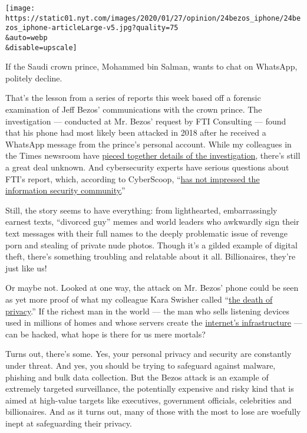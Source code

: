 \texttt{[image: https://static01.nyt.com/images/2020/01/27/opinion/24bezos\_iphone/24bezos\_iphone-articleLarge-v5.jpg?quality=75\\\&auto=webp\\\&disable=upscale]}

If the Saudi crown prince, Mohammed bin Salman, wants to chat on
WhatsApp, politely decline.

That's the lesson from a series of reports this week based off a
forensic examination of Jeff Bezos' communications with the crown
prince. The investigation --- conducted at Mr. Bezos' request by FTI
Consulting --- found that his phone had most likely been attacked in
2018 after he received a WhatsApp message from the prince's personal
account. While my colleagues in the Times newsroom have
\href{https://www.nytimes.com/2020/01/22/technology/jeff-bezos-hack-iphone.html}{pieced
together details of the investigation}, there's still a great deal
unknown. And cybersecurity experts have serious questions about FTI's
report, which, according to CyberScoop,
``\href{https://www.cyberscoop.com/jeff-bezos-mbs-hack-fti-report-questions/}{has
not impressed the information security community.}''

Still, the story seems to have everything: from lighthearted,
embarrassingly earnest texts, ``divorced guy'' memes and world leaders
who awkwardly sign their text messages with their full names to the
deeply problematic issue of revenge porn and stealing of private nude
photos. Though it's a gilded example of digital theft, there's something
troubling and relatable about it all. Billionaires, they're just like
us!

Or maybe not. Looked at one way, the attack on Mr. Bezos' phone could be
seen as yet more proof of what my colleague Kara Swisher called
``\href{https://www.nytimes.com/2019/01/18/opinion/amazon-jeff-bezos-affair.html}{the
death of privacy}.'' If the richest man in the world --- the man who
sells listening devices used in millions of homes and whose servers
create the
\href{https://twitter.com/alexstamos/status/1219768146615128064?s=20}{internet's
infrastructure} --- can be hacked, what hope is there for us mere
mortals?

Turns out, there's some. Yes, your personal privacy and security are
constantly under threat. And yes, you should be trying to safeguard
against malware, phishing and bulk data collection. But the Bezos attack
is an example of extremely targeted surveillance, the potentially
expensive and risky kind that is aimed at high-value targets like
executives, government officials, celebrities and billionaires. And as
it turns out, many of those with the most to lose are woefully inept at
safeguarding their privacy.

